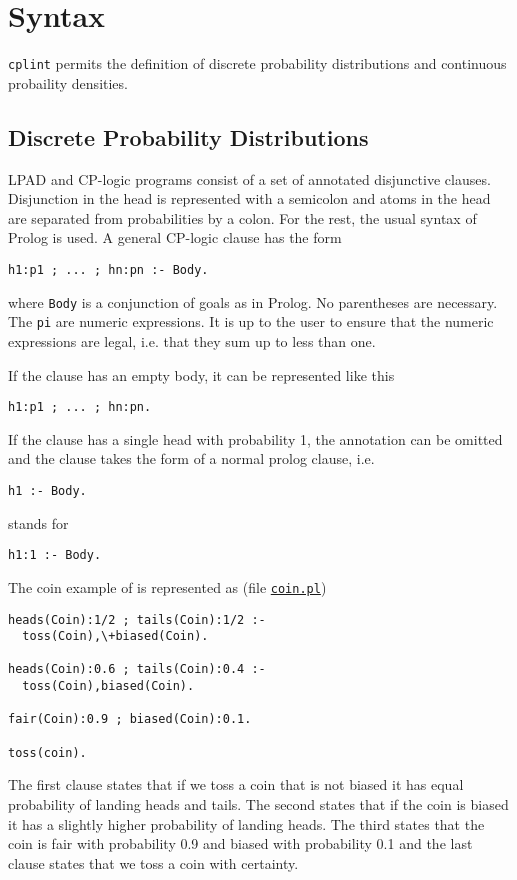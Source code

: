 \section{Syntax}
\label{syn}
\texttt{cplint} permits the definition of discrete probability distributions and continuous probaility
densities.
\subsection{Discrete Probability Distributions}
\label{discrete}
LPAD and CP-logic programs consist of a set of annotated disjunctive clauses.
Disjunction in the head is represented with a semicolon and atoms in the head are separated from probabilities by a colon. For the rest, the usual syntax of Prolog is used.
A general CP-logic clause has the form
\begin{verbatim}
h1:p1 ; ... ; hn:pn :- Body.
\end{verbatim}
where \verb|Body| is a conjunction of goals as in Prolog.
 No parentheses are necessary. The \texttt{pi} are numeric expressions. It is up to the user to ensure that the numeric expressions are legal, i.e. that they sum up to less than one.

If the clause has an empty body, it can be represented like this
\begin{verbatim}
h1:p1 ; ... ; hn:pn.
\end{verbatim}
If the clause has a single head with probability 1, the annotation can be omitted and the clause takes the form of a normal prolog clause, i.e. 
\begin{verbatim}
h1 :- Body.
\end{verbatim}
stands for 
\begin{verbatim}
h1:1 :- Body.
\end{verbatim}
The coin example of  \cite{VenVer04-ICLP04-IC} is represented as (file \href{http://cplint.eu/example/inference/coin.pl}{\texttt{coin.pl}})
\begin{verbatim}
heads(Coin):1/2 ; tails(Coin):1/2 :- 
  toss(Coin),\+biased(Coin).

heads(Coin):0.6 ; tails(Coin):0.4 :- 
  toss(Coin),biased(Coin).

fair(Coin):0.9 ; biased(Coin):0.1.

toss(coin).
\end{verbatim}
The first clause states that if we toss a coin that is not biased it has equal probability of landing heads and tails. The second states that if the coin is biased it has a slightly higher probability of landing heads. The third states that the coin is fair with probability 0.9 and biased with probability 0.1 and the last clause states that we toss a coin with certainty.

